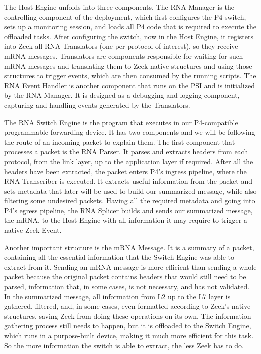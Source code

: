 The Host Engine unfolds into three components. The RNA Manager is the controlling component of the deployment, which first configures the P4 switch, sets up a monitoring session, and loads all P4 code that is required to execute the offloaded tasks. After configuring the switch, now in the Host Engine, it registers into Zeek all RNA Translators (one per protocol of interest), so they receive mRNA messages. Translators are components responsible for waiting for such mRNA messages and translating them to Zeek native structures and using those structures to trigger events, which are then consumed by the running scripts. The RNA Event Handler is another component that runs on the PSI and is initialized by the RNA Manager. It is designed as a debugging and logging component, capturing and handling events generated by the Translators.

The RNA Switch Engine is the program that executes in our P4-compatible programmable forwarding device. It has two components and we will be following the route of an incoming packet to explain them. The first component that processes a packet is the RNA Parser. It parses and extracts headers from each protocol, from the link layer, up to the application layer if required. After all the headers have been extracted, the packet enters P4's ingress pipeline, where the RNA Transcriber is executed. It extracts useful information from the packet and sets metadata that later will be used to build our summarized message, while also filtering some undesired packets. Having all the required metadata and going into P4's egress pipeline, the RNA Splicer builds and sends our summarized message, the mRNA, to the Host Engine with all information it may require to trigger a native Zeek Event.

Another important structure is the mRNA Message. It is a summary of a packet, containing all the essential information that the Switch Engine was able to extract from it. Sending an mRNA message is more efficient than sending a whole packet because the original packet contains headers that would still need to be parsed, information that, in some cases, is not necessary, and has not validated. In the summarized message, all information from L2 up to the L7 layer is gathered, filtered, and, in some cases, even formatted according to Zeek's native structures, saving Zeek from doing these operations on its own. The information-gathering process still needs to happen, but it is offloaded to the Switch Engine, which runs in a purpose-built device, making it much more efficient for this task. So the more information the switch is able to extract, the less Zeek has to do.

